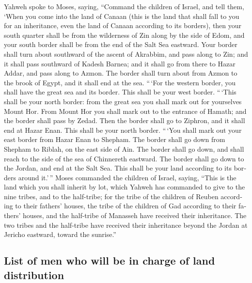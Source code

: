 \begin{paracol}{2}
\begin{otherlanguage}{english}
 Yahweh spoke to Moses, saying,  ``Command
the children of Israel, and tell them, `When you come into the land of
Canaan (this is the land that shall fall to you for an inheritance, even
the land of Canaan according to its borders),  then your
south quarter shall be from the wilderness of Zin along by the side of
Edom, and your south border shall be from the end of the Salt Sea
eastward.  Your border shall turn about southward of the
ascent of Akrabbim, and pass along to Zin; and it shall pass southward
of Kadesh Barnea; and it shall go from there to Hazar Addar, and pass
along to Azmon.  The border shall turn about from Azmon to
the brook of Egypt, and it shall end at the sea.  ``\,`For
the western border, you shall have the great sea and its border. This
shall be your west border.  ``\,`This shall be your north
border: from the great sea you shall mark out for yourselves Mount Hor.
 From Mount Hor you shall mark out to the entrance of
Hamath; and the border shall pass by Zedad.  Then the
border shall go to Ziphron, and it shall end at Hazar Enan. This shall
be your north border.  ``\,`You shall mark out your east
border from Hazar Enan to Shepham.  The border shall go
down from Shepham to Riblah, on the east side of Ain. The border shall
go down, and shall reach to the side of the sea of Chinnereth eastward.
 The border shall go down to the Jordan, and end at the
Salt Sea. This shall be your land according to its borders around
it.'\,''  Moses commanded the children of Israel, saying,
``This is the land which you shall inherit by lot, which Yahweh has
commanded to give to the nine tribes, and to the half-tribe;
 for the tribe of the children of Reuben according to
their fathers' houses, the tribe of the children of Gad according to
their fathers' houses, and the half-tribe of Manasseh have received
their inheritance.  The two tribes and the half-tribe
have received their inheritance beyond the Jordan at Jericho eastward,
toward the sunrise.''

\hypertarget{list-of-men-who-will-be-in-charge-of-land-distribution}{%
\subsection{List of men who will be in charge of land
distribution}\label{list-of-men-who-will-be-in-charge-of-land-distribution}}


\end{otherlanguage}
\end{paracol}
